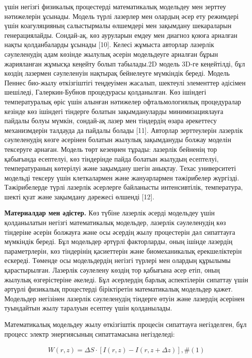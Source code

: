 \begin{multicols}{2}
үшін негізгі физикалық процестерді математикалық модельдеу мен зерттеу
нәтижелерін ұсынады. Модель түрлі лазерлер мен олардың әсер ету
режимдері үшін коагуляцияның салыстырмалы өлшемдері мен зақымдану
шекараларын генерациялайды. Сондай-ақ, көз ауруларын емдеу мен диагноз
қоюға арналған нақты қолданбаларды ұсынады {[}10{]}. Келесі жұмыста
авторлар лазерлік сәулеленудің адам көзінде жылулық әсерін модельдеуге
арналған бұрын жарияланған жұмысқа кеңейту болып табылады.2D модель
3D-ге кеңейтілді, бұл көздің лазермен сәулеленуін нақтырақ бейнелеуге
мүмкіндік береді. Модель Пеннес био-жылу өткізгіштігі теңдеуімен
жасалып, шектеулі элементтер әдісімен шешіледі, Галеркин-Бубнов
процедурасы қолданылған. Көз ішіндегі температуралық өріс үшін алынған
нәтижелер офтальмологиялық процедуралар кезінде көз ішіндегі тіндерге
болатын зақымдануларды минимизациялауға пайдалы болуы мүмкін, сондай-ақ
лазер мен тіндердің өзара әрекеттесу механизмдерін талдауда да пайдалы
болады {[}11{]}. Авторлар зерттеулерін лазерлік сәулеленудің көзге
әсерінен болатын жылулық зақымдануды болжау моделін тексеруге арнаған.
Модель төрт кезеңнен тұрады: лазерлік бейненің тор қабығында есептелуі,
көз тіндерінде пайда болатын жылудың есептелуі, температураның көтерілуі
және зақымдану шегін анықтау. Техас университеті модельді тексеру үшін
клеткалармен және жануарлармен тәжірибелер жүргізді. Тәжірибелерде түрлі
лазерлік әсерлерге байланысты интенсивтілік, температура, шекті қуат
және зақымдану дәрежесі өлшенді {[}12{]}.

{\bfseries Материалдар мен әдістер.} Көз түбіне лазерлік әсерді модельдеу
үшін қолданылатын негізгі математикалық модельдер, лазерлік сәулеленудің
көз тіндеріне әсерін болжауға және осы әсердің жылу процестерін дәл
сипаттауға мүмкіндік береді. Бұл модельдер әртүрлі факторларды, оның
ішінде лазердің параметрлерін, көз тіндерінің қасиеттерін және
биомеханикалық ерекшеліктерін ескереді. Төменде осы модельдердің негізгі
түрлері мен олардың құрылымы қарастырылған. Лазерлік сәулелену көздің
тор қабығына әсер етіп, оның жылулық өзгерістеріне әкеледі. Бұл
әсерлердің барлық аспектілерін сипаттау үшін әртүрлі физикалық
процестерді біріктіретін математикалық модельдер қажет. Модельдер
негізінен лазерлік сәулеленудің тіндерге өтуін және лазердің әсерінен
туындайтын жылу таралуын есептеу үшін қолданылады.

Математикалық модельдеу жылу өткізгіштік процесін сипаттауға
негізделген, бұл процесс электр энергиясының сипаттамасына негізделеді:

\[\begin{array}{r}
W(r,z) = \Delta S \cdot \left\lbrack I(r,z) - I(r,z + \Delta z) \right\rbrack,\#(1)
\end{array}\]


\end{multicols}
